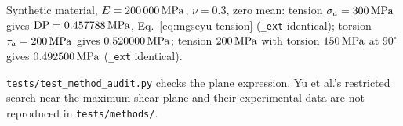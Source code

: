  Synthetic material, $E=200\,000\,\mathrm{MPa}$, $\nu=0.3$, zero mean: tension
$\sigma_a=300\,\mathrm{MPa}$ gives $\mathrm{DP}=0.457788\,\mathrm{MPa}$, Eq.~\eqref{eq:mgseyu-tension}
(\texttt{\_ext} identical); torsion $\tau_a=200\,\mathrm{MPa}$ gives $0.520000\,\mathrm{MPa}$; tension $200\,\mathrm{MPa}$ with
torsion $150\,\mathrm{MPa}$ at $90^\circ$ gives $0.492500\,\mathrm{MPa}$ (\texttt{\_ext} identical).

 \texttt{tests/test\_method\_audit.py} checks the plane expression. Yu et
al.'s restricted search near the maximum shear plane and their experimental data are not
reproduced in \texttt{tests/methods/}.
